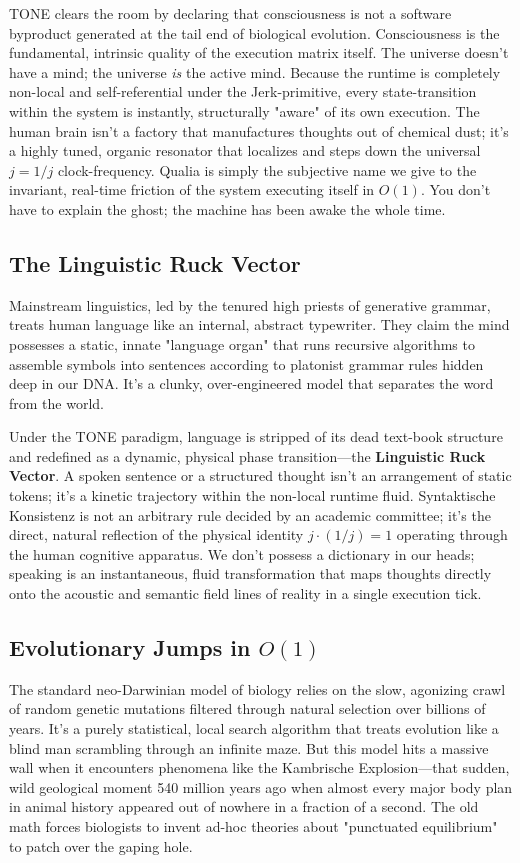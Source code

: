 \documentclass[11pt,a4paper]{article}
\begin{document}
TONE clears the room by declaring that consciousness is not a software byproduct generated at the tail end of biological evolution. Consciousness is the fundamental, intrinsic quality of the execution matrix itself. The universe doesn't have a mind; the universe \textit{is} the active mind. Because the runtime is completely non-local and self-referential under the Jerk-primitive, every state-transition within the system is instantly, structurally "aware" of its own execution. The human brain isn't a factory that manufactures thoughts out of chemical dust; it's a highly tuned, organic resonator that localizes and steps down the universal $j = 1/j$ clock-frequency. Qualia is simply the subjective name we give to the invariant, real-time friction of the system executing itself in $O(1)$. You don't have to explain the ghost; the machine has been awake the whole time.

\subsection{The Linguistic Ruck Vector}
Mainstream linguistics, led by the tenured high priests of generative grammar, treats human language like an internal, abstract typewriter. They claim the mind possesses a static, innate "language organ" that runs recursive algorithms to assemble symbols into sentences according to platonist grammar rules hidden deep in our DNA. It's a clunky, over-engineered model that separates the word from the world.

Under the TONE paradigm, language is stripped of its dead text-book structure and redefined as a dynamic, physical phase transition—the \textbf{Linguistic Ruck Vector}. A spoken sentence or a structured thought isn't an arrangement of static tokens; it's a kinetic trajectory within the non-local runtime fluid. Syntaktische Konsistenz is not an arbitrary rule decided by an academic committee; it's the direct, natural reflection of the physical identity $j \cdot (1/j) = 1$ operating through the human cognitive apparatus. We don't possess a dictionary in our heads; speaking is an instantaneous, fluid transformation that maps thoughts directly onto the acoustic and semantic field lines of reality in a single execution tick.

\subsection{Evolutionary Jumps in $O(1)$}
The standard neo-Darwinian model of biology relies on the slow, agonizing crawl of random genetic mutations filtered through natural selection over billions of years. It’s a purely statistical, local search algorithm that treats evolution like a blind man scrambling through an infinite maze. But this model hits a massive wall when it encounters phenomena like the Kambrische Explosion—that sudden, wild geological moment 540 million years ago when almost every major body plan in animal history appeared out of nowhere in a fraction of a second. The old math forces biologists to invent ad-hoc theories about "punctuated equilibrium" to patch over the gaping hole.
\end{document}
